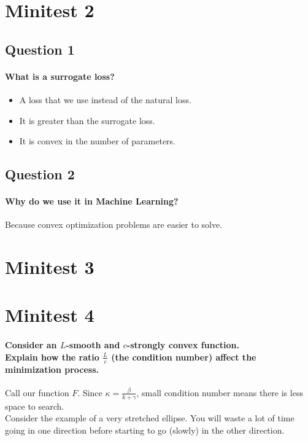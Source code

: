 \documentclass{article}
\newcommand{\1}{\mathbf{1}}
\begin{document}
\section{Minitest 2}
\subsection{Question 1}
\paragraph{What is a surrogate loss?}
\begin{itemize}
  \item A loss that we use instead of the natural loss.
  \item It is greater than the surrogate loss.
  \item It is convex in the number of parameters.
\end{itemize}

\subsection{Question 2}
\paragraph{Why do we use it in Machine Learning?}
Because convex optimization problems are easier to solve.



\section{Minitest 3}

\section{Minitest 4}
\paragraph{
  Consider an \(L\)-smooth and \(c\)-strongly convex function. \\
  Explain how the ratio \(\frac{L}{c}\) (the condition number) affect the minimization process.
}

Call our function \(F\). Since \(\kappa = \frac{\beta}{k + \gamma}\), small condition number means there is less space to search. \\
Consider the example of a very stretched ellipse. You will waste a lot of time going in one direction before starting to go (slowly) in the other direction.
\end{document}

